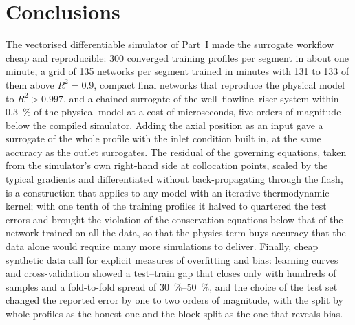 \documentclass[a4paper,fleqn]{cas-sc}
\begin{document}
\begin{table}[htbp]
\caption{Test error, overfitting gap and bias of the surrogates for different training sets and test-set strategies.}\label{tab:validation}
\footnotesize
\resizebox{\textwidth}{!}{}

\end{table}

\begin{table}[htbp]
\caption{Residual of the governing equations of the profile surrogates on the training and on a held-out collocation set.}\label{tab:residual}
\footnotesize


\end{table}

\section{Conclusions}\label{sec:conclusions}

The vectorised differentiable simulator of Part~I made the surrogate workflow cheap and reproducible: 300 converged training profiles per segment in about one minute, a grid of 135 networks per segment trained in minutes with 131 to 133 of them above $R^2 = 0.9$, compact final networks that reproduce the physical model to $R^2 > 0.997$, and a chained surrogate of the well--flowline--riser system within \SI{0.3}{\percent} of the physical model at a cost of microseconds, five orders of magnitude below the compiled simulator. Adding the axial position as an input gave a surrogate of the whole profile with the inlet condition built in, at the same accuracy as the outlet surrogates. The residual of the governing equations, taken from the simulator's own right-hand side at collocation points, scaled by the typical gradients and differentiated without back-propagating through the flash, is a construction that applies to any model with an iterative thermodynamic kernel; with one tenth of the training profiles it halved to quartered the test errors and brought the violation of the conservation equations below that of the network trained on all the data, so that the physics term buys accuracy that the data alone would require many more simulations to deliver. Finally, cheap synthetic data call for explicit measures of overfitting and bias: learning curves and cross-validation showed a test--train gap that closes only with hundreds of samples and a fold-to-fold spread of \SIrange{30}{50}{\percent}, and the choice of the test set changed the reported error by one to two orders of magnitude, with the split by whole profiles as the honest one and the block split as the one that reveals bias.
\end{document}
